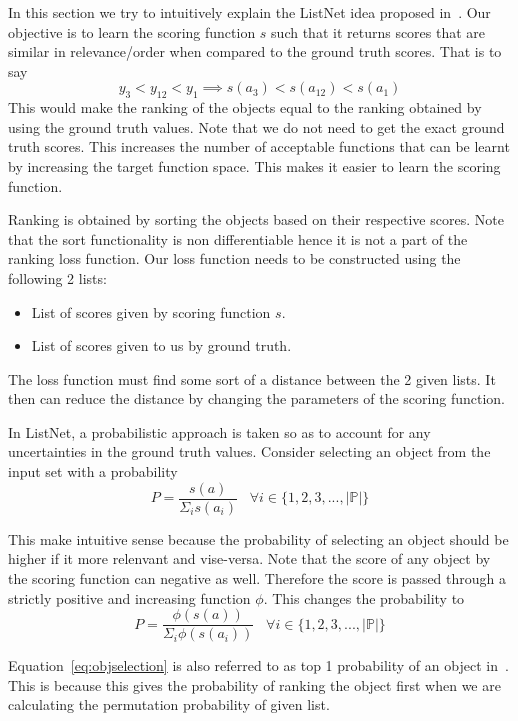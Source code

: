 \documentclass[12pt, twoside, ngerman]{report}
\begin{document}
In this section we try to intuitively explain the ListNet idea proposed in~\cite{listwisebetter}.
Our objective is to learn the scoring function $s$ such that it returns scores that are similar in relevance/order when compared to the ground truth scores.
That is to say
$$
y_3 < y_{12} < y_1 \implies s(a_3) < s(a_{12}) < s(a_1)
$$
This would make the ranking of the objects equal to the ranking obtained by using the ground truth values.
Note that we do not need to get the exact ground truth scores.
This increases the number of acceptable functions that can be learnt by increasing the target function space.
This makes it easier to learn the scoring function.

Ranking is obtained by sorting the objects based on their respective scores.
Note that the sort functionality is non differentiable hence it is not a 
part of the ranking loss function.
Our loss function needs to be constructed using the following 2 lists:
\begin{itemize}
\item List of scores given by scoring function $s$.
\item List of scores given to us by ground truth.
\end{itemize}

The loss function must find some sort of a distance between the 2 given lists.
It then can reduce the distance by changing the parameters of the scoring function.

In ListNet,  a probabilistic approach is taken so as to account for any uncertainties in the ground truth values.
Consider selecting an object from the input set with a probability
\begin{equation}
P = \frac{s(a)}{\Sigma_i s(a_i)} \;\;\; \forall i \in \{1, 2, 3, ...,  |\mathbb{P}|\}
\end{equation}

This make intuitive sense because the probability of selecting an object should be higher if it more relenvant and vise-versa.
Note that the score of any object by the scoring function can negative as well.
Therefore the score is passed through a strictly positive and increasing function $\phi$.
This changes the probability to
\begin{equation}\label{eq:objselection}
P = \frac{\phi(s(a))}{\Sigma_i \phi(s(a_i))} \;\;\; \forall i \in \{1, 2, 3, ...,  |\mathbb{P}|\}
\end{equation}

Equation~\ref{eq:objselection} is also referred to as top 1 probability of an object in~\cite{listwisebetter}.
This is because this gives the probability of ranking the object first when we are calculating the permutation probability of given list.
\end{document}
